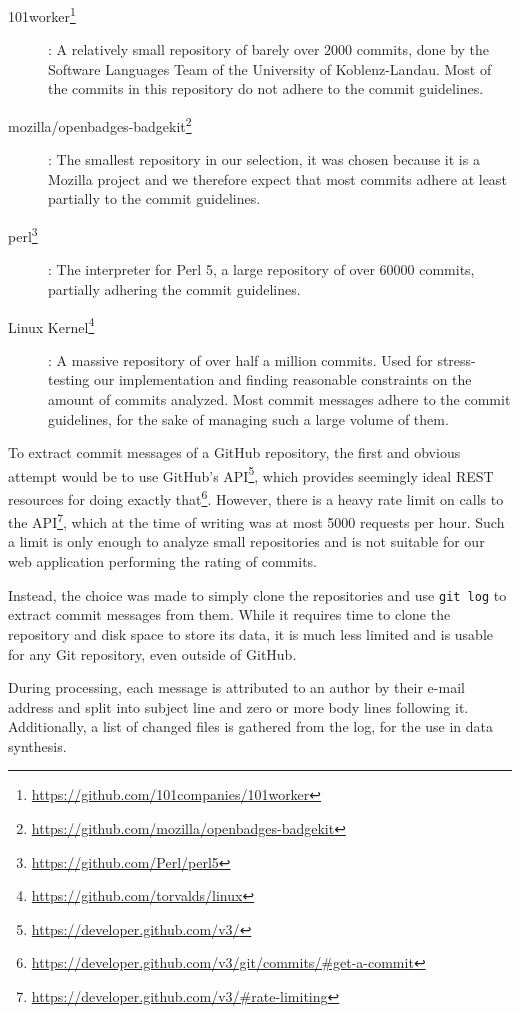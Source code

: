 \begin{description}
    \item[101worker\footnote{\url{https://github.com/101companies/101worker}}]: A relatively small repository of barely over $2000$ commits, done by the Software Languages Team of the University of Koblenz-Landau. Most of the commits in this repository do not adhere to the commit guidelines.
    \item[mozilla/openbadges-badgekit\footnote{\url{https://github.com/mozilla/openbadges-badgekit}}]: The smallest repository in our selection, it was chosen because it is a Mozilla project and we therefore expect that most commits adhere at least partially to the commit guidelines.
    \item[perl\footnote{\url{https://github.com/Perl/perl5}}]: The interpreter for Perl 5, a large repository of over $60000$ commits, partially adhering the commit guidelines.
    \item[Linux Kernel\footnote{\url{https://github.com/torvalds/linux}}]: A massive repository of over half a million commits. Used for stress-testing our implementation and finding reasonable constraints on the amount of commits analyzed. Most commit messages adhere to the commit guidelines, for the sake of managing such a large volume of them.
\end{description}

To extract commit messages of a GitHub repository, the first and obvious attempt would be to use GitHub's API\footnote{\url{https://developer.github.com/v3/}}, which provides seemingly ideal REST resources for doing exactly that\footnote{\url{https://developer.github.com/v3/git/commits/\#get-a-commit}}. However, there is a heavy rate limit on calls to the API\footnote{\url{https://developer.github.com/v3/\#rate-limiting}}, which at the time of writing was at most 5000 requests per hour. Such a limit is only enough to analyze small repositories and is not suitable for our web application performing the rating of commits.

Instead, the choice was made to simply clone the repositories and use \texttt{git log} to extract commit messages from them. While it requires time to clone the repository and disk space to store its data, it is much less limited and is usable for any Git repository, even outside of GitHub.

During processing, each message is attributed to an author by their e-mail address and split into subject line and zero or more body lines following it. Additionally, a list of changed files is gathered from the log, for the use in data synthesis.

